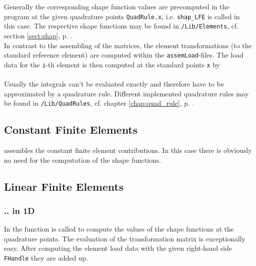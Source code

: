  
 Generally the corresponding shape function values are precomputed in the program at the given quadrature points {\tt QuadRule.x}, i.e. {\tt shap\_LFE} is called in this case. The respective shape functions may be found in {\tt /Lib/Elements}, cf. section \ref{sect:shap}, p. \pageref{sect:shap}. \\

 In contrast to the assembling of the matrices, the element transformations (to the standard reference element) are computed within the {\tt assemLoad}-files. The load data for the {\tt i}-th element is then computed at the standard points {\tt x} by \\

 \\

 Usually the integrals can't be evaluated exactly and therefore have to be approximated by a quadrature rule. Different implemented quadrature rules may be found in {\tt /Lib/QuadRules}, cf. chapter \ref{chap:quad_rule}, p. \pageref{chap:quad_rule}.



\subsection{Constant Finite Elements} 

  assembles the constant finite element contributions. In this case there is obviously no need for the computation of the shape functions.



\subsection{Linear Finite Elements} 

\subsubsection{.. in 1D}

 In  the function  is called to compute the values of the shape functions at the quadrature points. The evaluation of the transformation matrix is exceptionally easy. After computing the element load data with the given right-hand side {\tt FHandle} they are added up.

